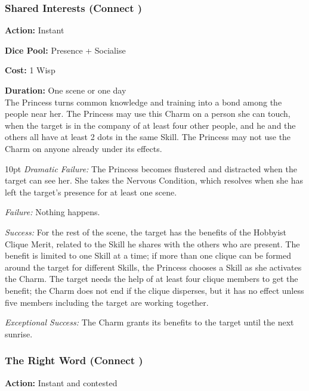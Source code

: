 \subsubsection*{Shared Interests (Connect \textbullet\textbullet)}

\noindent \textbf{Action:} Instant

\noindent \textbf{Dice Pool:}  Presence + Socialise 

\noindent \textbf{Cost:} 1 Wisp

\noindent \textbf{Duration:} One scene or one day \\

\noindent The Princess turns common knowledge and training into a bond among the people near her. The Princess may use this Charm on a person she can touch, when the target is in the company of at least four other people, and he and the others all have at least 2 dots in the same Skill. The Princess may not use the Charm on anyone already under its effects.

\begin{myindentpar}{10pt}
    \emph{Dramatic Failure:} The Princess becomes flustered and distracted when the target can see her. She takes the Nervous Condition, which resolves when she has left the target’s presence for at least one scene.
    
    \emph{Failure:} Nothing happens. 
    
    \emph{Success:} For the rest of the scene, the target has the benefits of the Hobbyist Clique Merit, related to the Skill he shares with the others who are present. The benefit
is limited to one Skill at a time; if more than one clique can be formed around the target for different Skills, the Princess chooses a Skill as she activates the Charm. The target needs the help of at least four clique members to get the benefit; the Charm does not end if the clique disperses, but it has no effect unless five members including the target are working together.
    
    \emph{Exceptional Success:} The Charm grants its benefits to the target until the next sunrise.
\end{myindentpar}

\subsubsection*{The Right Word (Connect \textbullet\textbullet)}

\noindent \textbf{Action:} Instant and contested

